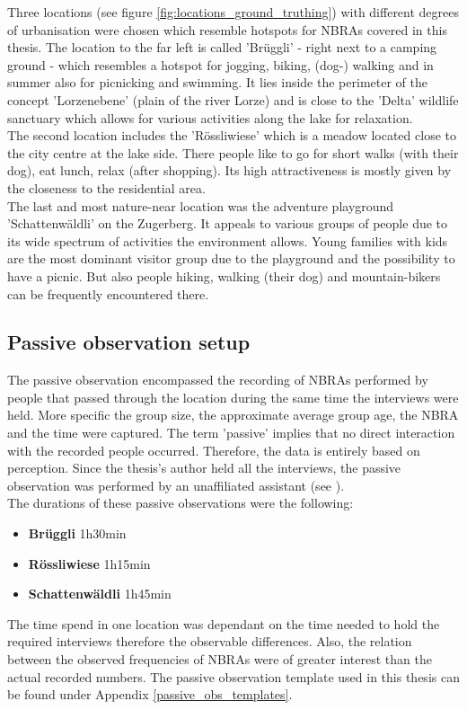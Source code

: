 Three locations (see figure \ref{fig:locations_ground_truthing}) with different degrees of urbanisation were chosen which resemble hotspots for NBRAs covered in this thesis. The location to the far left is called 'Br\"uggli' - right next to a camping ground - which resembles a hotspot for jogging, biking, (dog-) walking and in summer also for picnicking and swimming. It lies inside the perimeter of the concept 'Lorzenebene' (plain of the river Lorze) and is close to the 'Delta' wildlife sanctuary which allows for various activities along the lake for relaxation.\\
The second location includes the 'R\"ossliwiese' which is a meadow located close to the city centre at the lake side. There people like to go for short walks (with their dog), eat lunch, relax (after shopping). Its high attractiveness is mostly given by the closeness to the residential area.\\
The last and most nature-near location was the adventure playground 'Schattenw\"aldli' on the Zugerberg. It appeals to various groups of people due to its wide spectrum of activities the environment allows. Young families with kids are the most dominant visitor group due to the playground and the possibility to have a picnic. But also people hiking, walking (their dog) and mountain-bikers can be frequently encountered there.

\subsection{Passive observation setup} \label{passive_observation_setup}
The passive observation encompassed the recording of NBRAs performed by people that passed through the location during the same time the interviews were held. More specific the group size, the approximate average group age, the NBRA and the time were captured. The term 'passive' implies that no direct interaction with the recorded people occurred. Therefore, the data is entirely based on perception.
Since the thesis's author held all the interviews, the passive observation was performed by an unaffiliated assistant (see ).\\
The durations of these passive observations were the following:
\begin{itemize}
    \item \textbf{Br\"uggli} 1h30min
    \item \textbf{R\"ossliwiese} 1h15min
    \item \textbf{Schattenw\"aldli} 1h45min
\end{itemize}
The time spend in one location was dependant on the time needed to hold the required interviews therefore the observable differences. Also, the relation between the observed frequencies of NBRAs were of greater interest than the actual recorded numbers.
The passive observation template used in this thesis can be found under Appendix \ref{passive_obs_templates}.

